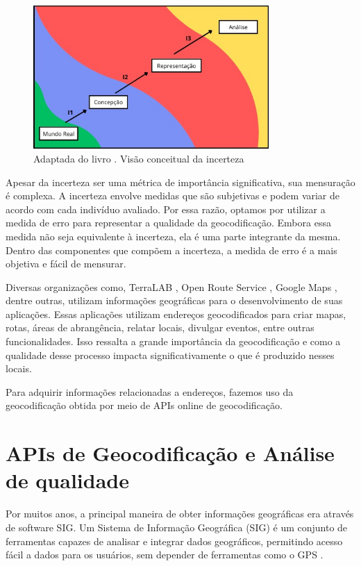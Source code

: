 \begin{figure}[ht]
   \centering
   \includegraphics[width=0.8\textwidth]{Figuras/incertezaMeu.jpeg}
   \caption{Adaptada do livro \cite{longley2013}. Visão conceitual da incerteza}
   \label{fig:incerteza}
\end{figure}

Apesar da incerteza ser uma métrica de importância significativa, sua mensuração é complexa. A incerteza envolve medidas que são subjetivas e podem variar de acordo com cada indivíduo avaliado. Por essa razão, optamos por utilizar a medida de erro para representar a qualidade da geocodificação. Embora essa medida não seja equivalente à incerteza, ela é uma parte integrante da mesma. Dentro das componentes que compõem a incerteza, a medida de erro é a mais objetiva e fácil de mensurar.

Diversas organizações como, TerraLAB \cite{terralab}, Open Route Service \cite{ors}, Google Maps \cite{maps}, dentre outras,  utilizam informações geográficas para o desenvolvimento de suas aplicações. Essas aplicações utilizam endereços geocodificados para criar mapas, rotas, áreas de abrangência, relatar locais, divulgar eventos, entre outras funcionalidades. Isso ressalta a grande importância da geocodificação e como a qualidade desse processo impacta significativamente o que é produzido nesses locais.

Para adquirir informações relacionadas a endereços, fazemos uso da geocodificação obtida por meio de APIs online de geocodificação.

\section{APIs de Geocodificação e Análise de qualidade}

Por muitos anos, a principal maneira de obter informações geográficas era através de software SIG. Um Sistema de Informação Geográfica (SIG) é um conjunto de ferramentas capazes de analisar e integrar dados geográficos, permitindo acesso fácil a dados para os usuários, sem depender de ferramentas como o GPS \cite{stein2021geoprocessamento}.

